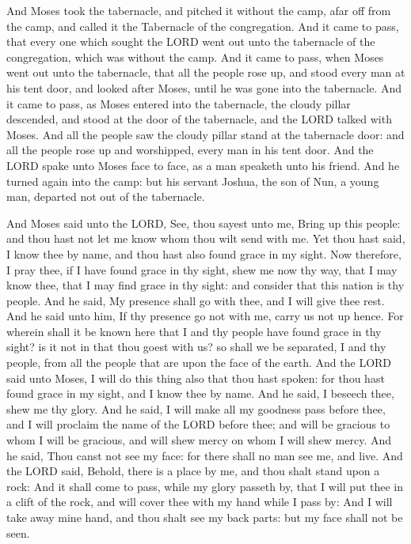  And Moses took the tabernacle, and pitched it without the
camp, afar off from the camp, and called it the Tabernacle of the
congregation. And it came to pass, that every one which sought the LORD
went out unto the tabernacle of the congregation, which was without the
camp.  And it came to pass, when Moses went out unto the
tabernacle, that all the people rose up, and stood every man at his tent
door, and looked after Moses, until he was gone into the tabernacle.
 And it came to pass, as Moses entered into the
tabernacle, the cloudy pillar descended, and stood at the door of the
tabernacle, and the LORD talked with Moses.  And all the
people saw the cloudy pillar stand at the tabernacle door: and all the
people rose up and worshipped, every man in his tent door.
 And the LORD spake unto Moses face to face, as a man
speaketh unto his friend. And he turned again into the camp: but his
servant Joshua, the son of Nun, a young man, departed not out of the
tabernacle.

 And Moses said unto the LORD, See, thou sayest unto me,
Bring up this people: and thou hast not let me know whom thou wilt send
with me. Yet thou hast said, I know thee by name, and thou hast also
found grace in my sight.  Now therefore, I pray thee, if
I have found grace in thy sight, shew me now thy way, that I may know
thee, that I may find grace in thy sight: and consider that this nation
is thy people.  And he said, My presence shall go with
thee, and I will give thee rest.  And he said unto him,
If thy presence go not with me, carry us not up hence. 
For wherein shall it be known here that I and thy people have found
grace in thy sight? is it not in that thou goest with us? so shall we be
separated, I and thy people, from all the people that are upon the face
of the earth.  And the LORD said unto Moses, I will do
this thing also that thou hast spoken: for thou hast found grace in my
sight, and I know thee by name.  And he said, I beseech
thee, shew me thy glory.  And he said, I will make all my
goodness pass before thee, and I will proclaim the name of the LORD
before thee; and will be gracious to whom I will be gracious, and will
shew mercy on whom I will shew mercy.  And he said, Thou
canst not see my face: for there shall no man see me, and live.
 And the LORD said, Behold, there is a place by me, and
thou shalt stand upon a rock:  And it shall come to pass,
while my glory passeth by, that I will put thee in a clift of the rock,
and will cover thee with my hand while I pass by:  And I
will take away mine hand, and thou shalt see my back parts: but my face
shall not be seen.

